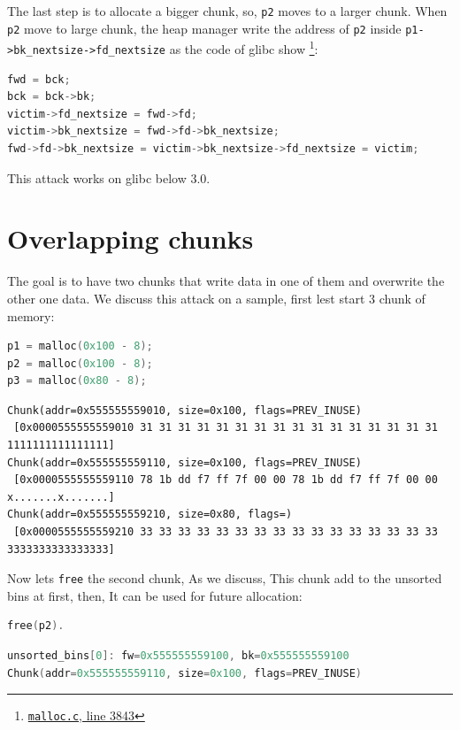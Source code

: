 \documentclass{masterthesis}
\newcommand*\libc{glibc}
\newcommand*\ub{unsorted bins}
\begin{document}
The last step is to allocate a bigger chunk, so, \lstinline{p2} moves to a larger chunk. When \lstinline{p2} move to large chunk, the heap manager write the address of \lstinline{p2} inside \lstinline{p1->bk_nextsize->fd_nextsize} as the code of \libc{} show \footnote{\href{https://sourceware.org/git/?p=glibc.git;a=blob;f=malloc/malloc.c;h=f7cd29bc2f93e1082ee77800bd64a4b2a2897055;hb=9ea3686266dca3f004ba874745a4087a89682617\#l3843}{\texttt{malloc.c}, line 3843}}:

\begin{lstlisting}[language=c,frame=tlrb]
fwd = bck;
bck = bck->bk;
victim->fd_nextsize = fwd->fd;
victim->bk_nextsize = fwd->fd->bk_nextsize;
fwd->fd->bk_nextsize = victim->bk_nextsize->fd_nextsize = victim;
 \end{lstlisting}

This attack works on \libc{} below 3.0.

\section{Overlapping chunks}
The goal is to have two chunks that write data in one of them and overwrite the other one data. We discuss this attack on a sample, first lest start 3 chunk of memory:

\begin{lstlisting}[language=c,frame=tlrb]
p1 = malloc(0x100 - 8);
p2 = malloc(0x100 - 8);
p3 = malloc(0x80 - 8);
 \end{lstlisting}

\begin{lstlisting}[frame=tlrb]
Chunk(addr=0x555555559010, size=0x100, flags=PREV_INUSE)
 [0x0000555555559010 31 31 31 31 31 31 31 31 31 31 31 31 31 31 31 31 1111111111111111]
Chunk(addr=0x555555559110, size=0x100, flags=PREV_INUSE)
 [0x0000555555559110 78 1b dd f7 ff 7f 00 00 78 1b dd f7 ff 7f 00 00 x.......x.......]
Chunk(addr=0x555555559210, size=0x80, flags=)
 [0x0000555555559210 33 33 33 33 33 33 33 33 33 33 33 33 33 33 33 33 3333333333333333]
 \end{lstlisting}

Now lets \lstinline{free} the second chunk, As we discuss, This chunk add to the \ub{} at first, then, It can be used for future allocation:

\begin{lstlisting}[language=c,frame=tlrb]
free(p2).
 \end{lstlisting}

\begin{lstlisting}[language=c,frame=tlrb]
unsorted_bins[0]: fw=0x555555559100, bk=0x555555559100
Chunk(addr=0x555555559110, size=0x100, flags=PREV_INUSE)
\end{lstlisting}
\end{document}
